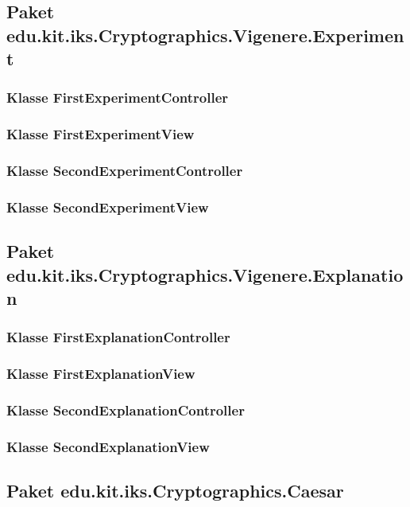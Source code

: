 \documentclass{article}
\begin{document}
  \subsection{Paket edu.kit.iks.Cryptographics.Vigenere.Experiment}
    \subsubsection{Klasse FirstExperimentController}

    \subsubsection{Klasse FirstExperimentView}

    \subsubsection{Klasse SecondExperimentController}

    \subsubsection{Klasse SecondExperimentView}

  \subsection{Paket edu.kit.iks.Cryptographics.Vigenere.Explanation}
    \subsubsection{Klasse FirstExplanationController}

    \subsubsection{Klasse FirstExplanationView}

    \subsubsection{Klasse SecondExplanationController}

    \subsubsection{Klasse SecondExplanationView}

  \subsection{Paket edu.kit.iks.Cryptographics.Caesar}
  
\end{document}
